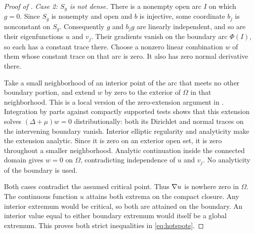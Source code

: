 \begin{proof}[Proof of ]
\smallskip\noindent
\emph{Case 2: $S_g$ is not dense.}
There is a nonempty open arc $I$ on which $g=0$. Since $S_g$ is nonempty and open and $b$ is injective, some coordinate $b_j$ is nonconstant on $S_g$. Consequently $g$ and $b_jg$ are linearly independent, and so are their eigenfunctions $u$ and $v_j$. Their gradients vanish on the boundary arc $\Phi(I)$, so each has a constant trace there. Choose a nonzero linear combination $w$ of them whose constant trace on that arc is zero. It also has zero normal derivative there.

Take a small neighborhood of an interior point of the arc that meets no other boundary portion, and extend $w$ by zero to the exterior of $\Omega$ in that neighborhood. This is a local version of the zero-extension argument in \cite[Lemma, p.~414]{Filonov2005}. Integration by parts against compactly supported tests shows that this extension solves $(\Delta+\mu)w=0$ distributionally: both its Dirichlet and normal traces on the intervening boundary vanish. Interior elliptic regularity and analyticity make the extension analytic. Since it is zero on an exterior open set, it is zero throughout a smaller neighborhood. Analytic continuation inside the connected domain gives $w=0$ on $\Omega$, contradicting independence of $u$ and $v_j$. No analyticity of the boundary is used.

Both cases contradict the assumed critical point. Thus $\nabla u$ is nowhere zero in $\Omega$. The continuous function $u$ attains both extrema on the compact closure. Any interior extremum would be critical, so both are attained on the boundary. An interior value equal to either boundary extremum would itself be a global extremum. This proves both strict inequalities in \eqref{eq:hotspots}.
\end{proof}
